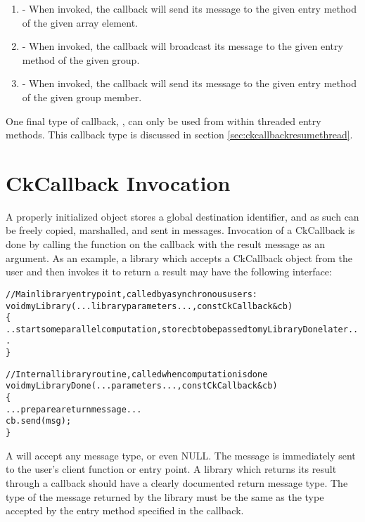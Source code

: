 \begin{enumerate}
\item {} - 
When invoked,
the callback will send its message to the given entry method
of the given array element. 

\item {} - 
When invoked,
the callback will broadcast its message to the given entry method
of the given group.

\item {} - 
When invoked, the callback will send its message to the given entry
method of the given group member.

\end{enumerate}

One final type of callback, , can only be
used from within threaded entry methods.  This callback type is
discussed in section \ref{sec:ckcallbackresumethread}.

\section{CkCallback Invocation}

\label{libraryInterface}

A properly initialized  object stores a global
destination identifier, and as such can be freely copied, marshalled,
and sent in messages. Invocation of a CkCallback is done by calling
the function  on the callback with the result message as an
argument. As an example, a library which accepts a CkCallback object
from the user and then invokes it to return a result may have the
following interface:

\begin{alltt}
//Main library entry point, called by asynchronous users:
void myLibrary(...library parameters...,const CkCallback \&cb) 
\{
  ..start some parallel computation, store cb to be passed to myLibraryDone later...
\}

//Internal library routine, called when computation is done
void myLibraryDone(...parameters...,const CkCallback \&cb)
\{
  ...prepare a return message...
  cb.send(msg);
\}
\end{alltt}

A  will accept any message type, or even NULL.  The
message is immediately sent to the user's client function or entry
point.  A library which returns its result through a callback should
have a clearly documented return message type. The type of the message
returned by the library must be the same as the type accepted by the
entry method specified in the callback. 

